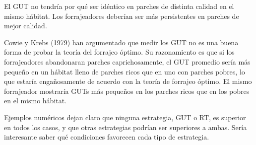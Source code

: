 \documentclass[a4paper,12pt]{article}
\begin{document}
El GUT no tendría por qué ser idéntico en parches de distinta calidad en el mismo hábitat. Los forrajeadores deberían ser más persistentes en parches de mejor calidad.

Cowie y Krebs (1979) han argumentado que medir los GUT no es una buena forma de probar la teoría del forrajeo óptimo. Su razonamiento es que si los forrajeadores abandonaran parches caprichosamente, el GUT promedio sería más pequeño en un hábitat lleno de parches ricos que en uno con parches pobres, lo que estaría engañosamente de acuerdo con la teoría de forrajeo óptimo. El mismo forrajeador mostraría GUTs más pequeños en los parches ricos que en los pobres en el mismo hábitat. 

Ejemplos numéricos dejan claro que ninguna estrategia, GUT o RT, es superior en todos los casos, y que otras estrategias podrían ser superiores a ambas. Sería interesante saber qué condiciones favorecen cada tipo de estrategia. 
\end{document}

